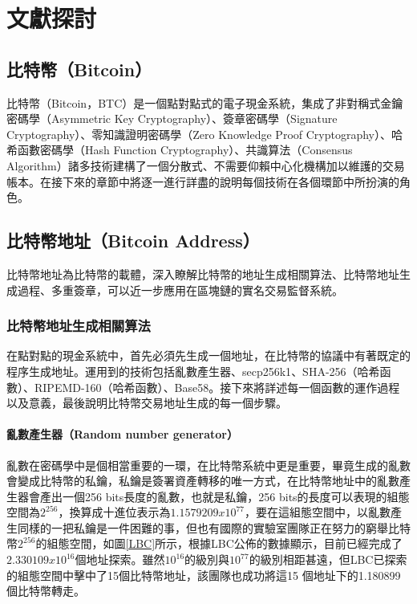 
\chapter{文獻探討}

	\section{比特幣（Bitcoin）}
	比特幣（Bitcoin，BTC）是一個點對點式的電子現金系統，集成了非對稱式金鑰密碼學（Asymmetric Key Cryptography）\supercite{AsymmetricKeyCryptography}、簽章密碼學（Signature Cryptography）\supercite{Apublickeycryptosystemandasignatureschemebasedondiscretelogarithms}、零知識證明密碼學（Zero Knowledge Proof Cryptography）\supercite{Zero-KnowledgeProofsofIdentity}、哈希函數密碼學（Hash Function Cryptography）、共識算法（Consensus Algorithm）\supercite{Anonymousbyzantineconsensusfrommoderately-hardpuzzles:Amodelforbitcoin}諸多技術建構了一個分散式、不需要仰賴中心化機構加以維護的交易帳本。在接下來的章節中將逐一進行詳盡的說明每個技術在各個環節中所扮演的角色。

	\section{比特幣地址（Bitcoin Address）}
	⽐特幣地址為⽐特幣的載體，深⼊瞭解⽐特幣的地址⽣成相關算法、⽐特幣地址⽣成過程、多重簽章，可以近⼀步應⽤在區塊鏈的實名交易監督系統。

		\subsection{比特幣地址生成相關算法}
		在點對點的現金系統中，首先必須先生成一個地址，在比特幣的協議中有著既定的程序生成地址。運用到的技術包括亂數產生器、secp256k1\supercite{johnson2001elliptic}、SHA-256（哈希函數）\supercite{DBLP:conf/fse/KhovratovichRS12}、RIPEMD-160（哈希函數）\supercite{DBLP:conf/isw/MendelPRR06}、Base58\supercite{Base58}。接下來將詳述每一個函數的運作過程以及意義，最後說明比特幣交易地址生成的每一個步驟。
		
			\subsubsection{亂數產生器（Random number generator）}
			亂數在密碼學中是個相當重要的一環，在比特幣系統中更是重要，畢竟生成的亂數會變成比特幣的私鑰，私鑰是簽署資產轉移的唯一方式，在比特幣地址中的亂數產生器會產出一個256 bits長度的亂數，也就是私鑰，256 bits的長度可以表現的組態空間為$2^{256}$，換算成十進位表示為$1.1579209x10^{77}$，要在這組態空間中，以亂數產生同樣的一把私鑰是一件困難的事，但也有國際的實驗室\supercite{TheLargeBitcoinCollider}團隊正在努力的窮舉比特幣$2^{256}$的組態空間，如圖\ref{LBC}所示，根據LBC公佈的數據顯示，目前已經完成了$2.330109x10^{16}$個地址探索。雖然$10^{16}$的級別與$10^{77}$的級別相距甚遠，但LBC已探索的組態空間中擊中了15個比特幣地址，該團隊也成功將這15 個地址下的1.180899個比特幣轉走。

